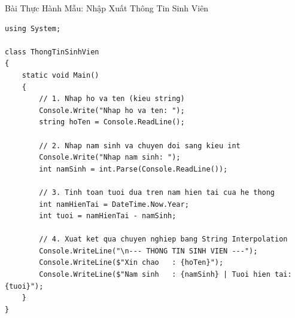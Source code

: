 \documentclass[aspectratio=169, 10pt]{beamer}
\begin{document}
\begin{frame}[fragile]{Bài Thực Hành Mẫu: Nhập Xuất Thông Tin Sinh Viên}
\begin{lstlisting}
using System;

class ThongTinSinhVien
{
    static void Main()
    {
        // 1. Nhap ho va ten (kieu string)
        Console.Write("Nhap ho va ten: ");
        string hoTen = Console.ReadLine();

        // 2. Nhap nam sinh va chuyen doi sang kieu int
        Console.Write("Nhap nam sinh: ");
        int namSinh = int.Parse(Console.ReadLine());

        // 3. Tinh toan tuoi dua tren nam hien tai cua he thong
        int namHienTai = DateTime.Now.Year;
        int tuoi = namHienTai - namSinh;

        // 4. Xuat ket qua chuyen nghiep bang String Interpolation
        Console.WriteLine("\n--- THONG TIN SINH VIEN ---");
        Console.WriteLine($"Xin chao   : {hoTen}");
        Console.WriteLine($"Nam sinh   : {namSinh} | Tuoi hien tai: {tuoi}");
    }
}
\end{lstlisting}
\end{frame}
\end{document}
